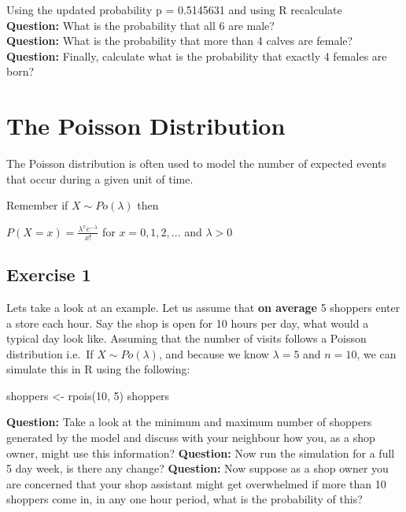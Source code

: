 \documentclass[
  10pt,
  letterpaper,
  DIV=11,
  numbers=noendperiod]{scrartcl}
\newenvironment{Shaded}{\begin{snugshade}}{\end{snugshade}}
\newcommand{\DecValTok}[1]{\textcolor[rgb]{0.68,0.00,0.00}{#1}}
\newcommand{\FunctionTok}[1]{\textcolor[rgb]{0.28,0.35,0.67}{#1}}
\newcommand{\NormalTok}[1]{\textcolor[rgb]{0.00,0.23,0.31}{#1}}
\newcommand{\OtherTok}[1]{\textcolor[rgb]{0.00,0.23,0.31}{#1}}
\begin{document}
Using the updated probability p = 0.5145631 and using R recalculate\\

\textbf{Question:} What is the probability that all 6 are male?\\
\textbf{Question:} What is the probability that more than 4 calves are
female?\\
\textbf{Question:} Finally, calculate what is the probability that
exactly 4 females are born?\\

\hypertarget{the-poisson-distribution}{%
\section{The Poisson Distribution}\label{the-poisson-distribution}}

The Poisson distribution is often used to model the number of expected
events that occur during a given unit of time.

Remember if \(X \sim Po(\lambda)\) then

\(P(X=x)=\frac{\lambda^xe^{-\lambda}}{x!}\) for \(x = 0,1,2,...\) and
\(\lambda>0\)

\hypertarget{exercise-1-1}{%
\subsection{Exercise 1}\label{exercise-1-1}}

Lets take a look at an example. Let us assume that \textbf{on average} 5
shoppers enter a store each hour. Say the shop is open for 10 hours per
day, what would a typical day look like. Assuming that the number of
visits follows a Poisson distribution i.e.~If \(X \sim Po(\lambda)\),
and because we know \(\lambda=5\) and \(n=10\), we can simulate this in
R using the following:

\begin{Shaded}
\begin{Highlighting}[]
\NormalTok{shoppers }\OtherTok{\textless{}{-}} \FunctionTok{rpois}\NormalTok{(}\DecValTok{10}\NormalTok{, }\DecValTok{5}\NormalTok{)}
\NormalTok{shoppers}
\end{Highlighting}
\end{Shaded}

\textbf{Question:} Take a look at the minimum and maximum number of
shoppers generated by the model and discuss with your neighbour how you,
as a shop owner, might use this information? \textbf{Question:} Now run
the simulation for a full 5 day week, is there any change?
\textbf{Question:} Now suppose as a shop owner you are concerned that
your shop assistant might get overwhelmed if more than 10 shoppers come
in, in any one hour period, what is the probability of this?
\end{document}
